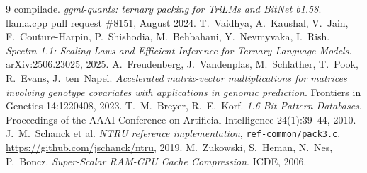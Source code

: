 \documentclass[11pt,a4paper]{article}
\newcommand{\code}[1]{\texttt{#1}}
\begin{document}
\begin{thebibliography}{9}
\setlength{\itemsep}{0pt}
 compilade. \emph{ggml-quants: ternary packing for TriLMs and
  BitNet b1.58}. llama.cpp pull request \#8151, August 2024.
 T.~Vaidhya, A.~Kaushal, V.~Jain, F.~Couture-Harpin,
  P.~Shishodia, M.~Behbahani, Y.~Nevmyvaka, I.~Rish. \emph{Spectra 1.1: Scaling
  Laws and Efficient Inference for Ternary Language Models}. arXiv:2506.23025,
  2025.
 A.~Freudenberg, J.~Vandenplas, M.~Schlather, T.~Pook,
  R.~Evans, J.~ten~Napel. \emph{Accelerated matrix-vector multiplications for
  matrices involving genotype covariates with applications in genomic
  prediction}. Frontiers in Genetics 14:1220408, 2023.
 T.~M.~Breyer, R.~E.~Korf. \emph{1.6-Bit Pattern
  Databases}. Proceedings of the AAAI Conference on Artificial Intelligence
  24(1):39--44, 2010.
 J.~M.~Schanck et al. \emph{NTRU reference implementation},
  \code{ref-common/pack3.c}. \url{https://github.com/jschanck/ntru}, 2019.
 M.~Zukowski, S.~Heman, N.~Nes, P.~Boncz. \emph{Super-Scalar
  RAM-CPU Cache Compression}. ICDE, 2006.
\end{thebibliography}
\end{document}
